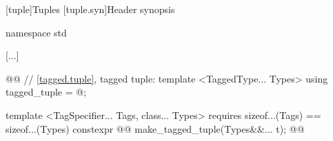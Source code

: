 \setcounter{section}{4}
[tuple]{Tuples}
[tuple.syn]{Header  synopsis}
\begin{codeblock}
namespace std {
  [...]

  @@
  // \ref{tagged.tuple}, tagged tuple:
  template <TaggedType... Types>
  using tagged_tuple = @\seebelow@;

  template <TagSpecifier... Tags, class... Types>
    requires sizeof...(Tags) == sizeof...(Types)
      constexpr @\oldtxt{\seebelow}@ make_tagged_tuple(Types&&... t);
  @\oldtxt{\}\}\}}@
}
\end{codeblock}


